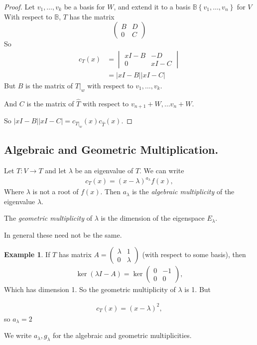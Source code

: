 \documentclass{article}
\theoremstyle{definition} \newtheorem*{definition}{Definition}
\newtheorem*{exmp}{Example} \newtheorem*{exmps}{Examples}
\begin{document}
\begin{proof}
  Let $v_1, \dots, v_k$ be a basis for $W$, and extend it to a basis
  $\mathbb{B} \left\{ v_1, \dots, v_n \right\}$ for $V$ With respect to 
  $\mathbb{B}$, $T$ has the matrix
  \[
    \left( 
    \begin{matrix}
      B & D \\
      0 & C
    \end{matrix}
    \right)
  \]
  So 
  \begin{align*}
  c_T(x) &= 
  \begin{vmatrix}
    xI - B & -D \\
    0 & xI - C
  \end{vmatrix}\\
  &= |xI - B| |xI - C|
  \end{align*}
  But $B$ is the matrix of $T|_w$ with respect to $v_1, \dots, v_k$.

  And $C$ is the matrix of $\hat{T}$ with respect to $v_{n+1}+W, \dots v_n
  + W$.

  So $|xI - B||xI - C| = c_{T|_w}(x)c_{\hat{T}}(x)$.
\end{proof}


\subsection{Algebraic and Geometric Multiplication.}
Let $T:V \rightarrow T$ and let $\lambda$ be an eigenvalue of $T$.
We can write 
\begin{align*}
  c_T(x) = (x-\lambda)^{a_\lambda}f(x),
\end{align*}
Where $\lambda$ is not a root of $f(x)$.
Then $a_\lambda$ is the \emph{algebraic multiplicity} of the 
eigenvalue $\lambda$.

The \emph{geometric multiplicity} of $\lambda$ is the dimension of the
eigenspace $E_\lambda$.

In general these need not be the same.


\begin{exmp}
  If $T$ has matrix $A = 
  \left( 
  \begin{matrix}
    \lambda & 1 \\
    0 & \lambda
  \end{matrix}
  \right)$
  (with respect to some basis), then
  \begin{align*}
    \ker (\lambda I - A) = \ker \left( 
    \begin{matrix}
      0 & -1 \\
      0 & 0
    \end{matrix}
    \right),
  \end{align*}
  Which has dimension 1. So the geometric multiplicity of $\lambda$ is 1.
  But 

  \begin{align*}
    c_T(x) = (x - \lambda )^2,
  \end{align*}
  so $a_\lambda = 2$

  We write $a_\lambda, g_\lambda$ for the algebraic and geometric 
  multiplicities.\\
\end{exmp}
\end{document}
